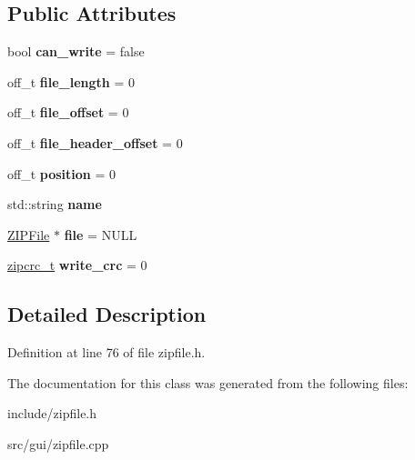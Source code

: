 \subsection*{Public Attributes}
\begin{DoxyCompactItemize}
\item 
\hypertarget{classZIPFileEntry_a52fd68513314bc21f3e35c2ed3435ec2}{bool {\bfseries can\-\_\-write} = false}\label{classZIPFileEntry_a52fd68513314bc21f3e35c2ed3435ec2}

\item 
\hypertarget{classZIPFileEntry_aebe510451a50dcf2e3a67743d9e3cea1}{off\-\_\-t {\bfseries file\-\_\-length} = 0}\label{classZIPFileEntry_aebe510451a50dcf2e3a67743d9e3cea1}

\item 
\hypertarget{classZIPFileEntry_aea599886a93e8ba6407f3db88789f4a8}{off\-\_\-t {\bfseries file\-\_\-offset} = 0}\label{classZIPFileEntry_aea599886a93e8ba6407f3db88789f4a8}

\item 
\hypertarget{classZIPFileEntry_aa8a46c861bcf91f87718b0c4189fb93b}{off\-\_\-t {\bfseries file\-\_\-header\-\_\-offset} = 0}\label{classZIPFileEntry_aa8a46c861bcf91f87718b0c4189fb93b}

\item 
\hypertarget{classZIPFileEntry_a55efcd3210cb7cfc56ed1635a1922533}{off\-\_\-t {\bfseries position} = 0}\label{classZIPFileEntry_a55efcd3210cb7cfc56ed1635a1922533}

\item 
\hypertarget{classZIPFileEntry_a3e1eb491fb357c54d540886c04f2da0a}{std\-::string {\bfseries name}}\label{classZIPFileEntry_a3e1eb491fb357c54d540886c04f2da0a}

\item 
\hypertarget{classZIPFileEntry_a4426facc60c48fceaca769eec0683bc5}{\hyperlink{classZIPFile}{Z\-I\-P\-File} $\ast$ {\bfseries file} = N\-U\-L\-L}\label{classZIPFileEntry_a4426facc60c48fceaca769eec0683bc5}

\item 
\hypertarget{classZIPFileEntry_a0b517f16131794105e0fa13673f46295}{\hyperlink{zipcrc_8h_ab36f4248ec4261fdd5522ac238daed66}{zipcrc\-\_\-t} {\bfseries write\-\_\-crc} = 0}\label{classZIPFileEntry_a0b517f16131794105e0fa13673f46295}

\end{DoxyCompactItemize}


\subsection{Detailed Description}


Definition at line 76 of file zipfile.\-h.



The documentation for this class was generated from the following files\-:\begin{DoxyCompactItemize}
\item 
include/zipfile.\-h\item 
src/gui/zipfile.\-cpp\end{DoxyCompactItemize}
